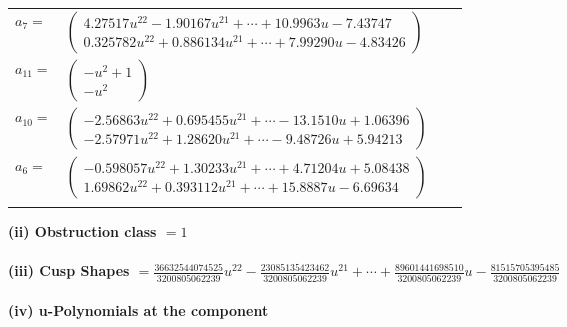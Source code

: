 \documentclass[1p]{elsarticle_modified}
\theoremstyle{definition}
\begin{document}
\begin{tabular}{m{7pt} m{180pt} m{7pt} m{180pt} }
\flushright $a_{7}=$&$\begin{pmatrix}4.27517 u^{22}-1.90167 u^{21}+\cdots+10.9963 u-7.43747\\0.325782 u^{22}+0.886134 u^{21}+\cdots+7.99290 u-4.83426\end{pmatrix}$ \\
\flushright $a_{11}=$&$\begin{pmatrix}- u^2+1\\- u^2\end{pmatrix}$ \\
\flushright $a_{10}=$&$\begin{pmatrix}-2.56863 u^{22}+0.695455 u^{21}+\cdots-13.1510 u+1.06396\\-2.57971 u^{22}+1.28620 u^{21}+\cdots-9.48726 u+5.94213\end{pmatrix}$ \\
\flushright $a_{6}=$&$\begin{pmatrix}-0.598057 u^{22}+1.30233 u^{21}+\cdots+4.71204 u+5.08438\\1.69862 u^{22}+0.393112 u^{21}+\cdots+15.8887 u-6.69634\end{pmatrix}$\\&\end{tabular}
\flushleft \textbf{(ii) Obstruction class $= 1$}\\~\\
\flushleft \textbf{(iii) Cusp Shapes $= \frac{36632544074525}{3200805062239} u^{22}-\frac{23085135423462}{3200805062239} u^{21}+\cdots+\frac{89601441698510}{3200805062239} u-\frac{81515705395485}{3200805062239}$}\\~\\
\newpage\renewcommand{\arraystretch}{1}
\flushleft \textbf{(iv) u-Polynomials at the component}\newline \\
\end{document}
